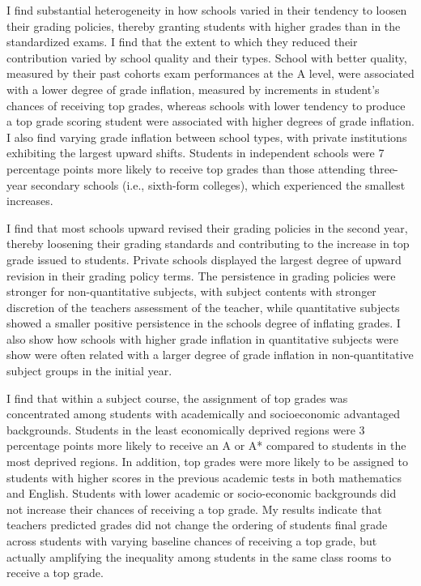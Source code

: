 \vspace{1em}

I find substantial heterogeneity in how schools varied in their tendency to loosen their grading policies, thereby granting students with higher grades than in the standardized exams. I find that the extent to which they reduced their contribution varied by school quality and their types. School with better quality, measured by their past cohorts exam performances at the A level, were associated with a lower degree of grade inflation, measured by increments in student's chances of receiving top grades, whereas schools with lower tendency to produce a top grade scoring student were associated with higher degrees of grade inflation.  I also find varying grade inflation between school types, with private institutions exhibiting the largest upward shifts. Students in independent schools were 7 percentage points more likely to receive top grades than those attending three-year secondary schools (i.e., sixth-form colleges), which experienced the smallest increases. 

I find that most schools upward revised their grading policies in the second year, thereby loosening their grading standards and contributing to the increase in top grade issued to students. Private schools displayed the largest degree of upward revision in their grading policy terms. The persistence in grading policies were stronger for non-quantitative subjects, with subject contents with stronger discretion of the teachers assessment of the teacher, while quantitative subjects showed a smaller positive persistence in the schools degree of inflating grades. I also show how schools with higher grade inflation in quantitative subjects were show were often related with a larger degree of grade inflation in non-quantitative subject groups in the initial year. 

I find that within a subject course, the assignment of top grades was concentrated among students with academically and socioeconomic advantaged backgrounds. Students in the least economically deprived regions were 3 percentage points more likely to receive an A or A* compared to students in the most deprived regions. In addition, top grades were more likely to be assigned to students with higher scores in the previous academic tests in both mathematics and English. Students with lower academic or socio-economic backgrounds did not increase their chances of receiving a top grade. My results indicate that teachers predicted grades did not change the ordering of students final grade across students with varying baseline chances of receiving a top grade, but actually amplifying the inequality among students in the same class rooms to receive a top grade. 

